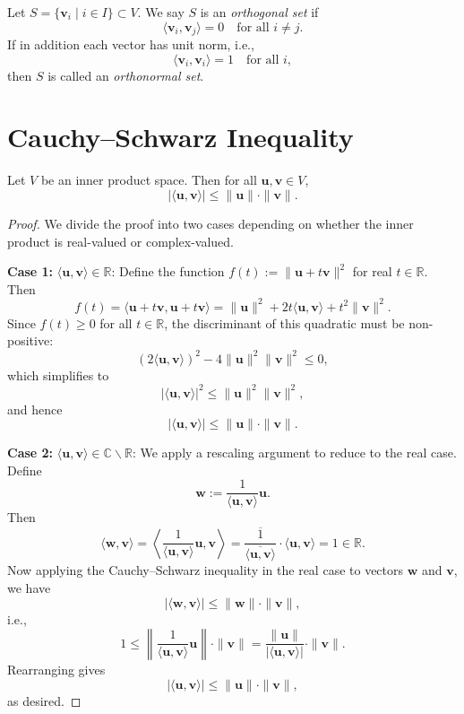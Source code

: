 \begin{definition}\label{def:orthogonal}
Let \( S = \{ \mathbf{v}_i \mid i \in I \} \subset V \). We say \( S \) is an \emph{orthogonal set} if
\[
\langle \mathbf{v}_i, \mathbf{v}_j \rangle = 0 \quad \text{for all } i \neq j.
\]
If in addition each vector has unit norm, i.e.,
\[
\langle \mathbf{v}_i, \mathbf{v}_i \rangle = 1 \quad \text{for all } i,
\]
then \( S \) is called an \emph{orthonormal set}.
\end{definition}

\section{Cauchy–Schwarz Inequality}
\begin{proposition}\label{prop:cauchy-schwarz}
Let \( V \) be an inner product space. Then for all \( \mathbf{u}, \mathbf{v} \in V \),
\[
| \langle \mathbf{u}, \mathbf{v} \rangle | \leq \| \mathbf{u} \| \cdot \| \mathbf{v} \|.
\]
\end{proposition}

\begin{proof}
We divide the proof into two cases depending on whether the inner product is real-valued or complex-valued.

\textbf{Case 1:} \( \langle \mathbf{u}, \mathbf{v} \rangle \in \mathbb{R} \): Define the function \( f(t) := \| \mathbf{u} + t\mathbf{v} \|^2 \) for real \( t \in \mathbb{R} \). Then
\[
f(t) = \langle \mathbf{u} + t\mathbf{v}, \mathbf{u} + t\mathbf{v} \rangle = \| \mathbf{u} \|^2 + 2t \langle \mathbf{u}, \mathbf{v} \rangle + t^2 \| \mathbf{v} \|^2.
\]
Since \( f(t) \geq 0 \) for all \( t \in \mathbb{R} \), the discriminant of this quadratic must be non-positive:
\[
(2 \langle \mathbf{u}, \mathbf{v} \rangle)^2 - 4 \| \mathbf{u} \|^2 \| \mathbf{v} \|^2 \leq 0,
\]
which simplifies to
\[
|\langle \mathbf{u}, \mathbf{v} \rangle|^2 \leq \| \mathbf{u} \|^2 \| \mathbf{v} \|^2,
\]
and hence
\[
|\langle \mathbf{u}, \mathbf{v} \rangle| \leq \| \mathbf{u} \| \cdot \| \mathbf{v} \|.
\]

\textbf{Case 2:} \( \langle \mathbf{u}, \mathbf{v} \rangle \in \mathbb{C} \smallsetminus \mathbb{R} \): We apply a rescaling argument to reduce to the real case. Define
\[
\mathbf{w} := \frac{1}{\langle \mathbf{u}, \mathbf{v} \rangle} \mathbf{u}.
\]
Then
\[
\langle \mathbf{w}, \mathbf{v} \rangle 
= \left\langle \frac{1}{\langle \mathbf{u}, \mathbf{v} \rangle} \mathbf{u}, \mathbf{v} \right\rangle
= \overline{ \frac{1}{\overline{ \langle \mathbf{u}, \mathbf{v} \rangle }} } \cdot \langle \mathbf{u}, \mathbf{v} \rangle = 1 \in \mathbb{R}.
\]
Now applying the Cauchy–Schwarz inequality in the real case to vectors \( \mathbf{w} \) and \( \mathbf{v} \), we have
\[
| \langle \mathbf{w}, \mathbf{v} \rangle | \leq \| \mathbf{w} \| \cdot \| \mathbf{v} \|,
\]
i.e.,
\[
1 \leq \left\| \frac{1}{\langle \mathbf{u}, \mathbf{v} \rangle} \mathbf{u} \right\| \cdot \| \mathbf{v} \| = \frac{\| \mathbf{u} \|}{| \langle \mathbf{u}, \mathbf{v} \rangle |} \cdot \| \mathbf{v} \|.
\]
Rearranging gives
\[
| \langle \mathbf{u}, \mathbf{v} \rangle | \leq \| \mathbf{u} \| \cdot \| \mathbf{v} \|,
\]
as desired.
\end{proof}


